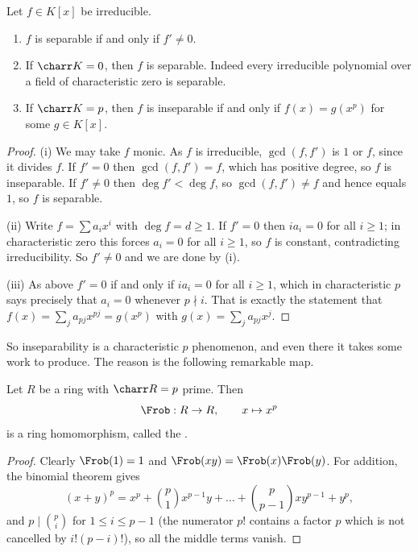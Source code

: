 \begin{proposition}\label{prop:sepcrit}
	Let $f \in K[x]$ be irreducible.
	\begin{enumerate}[label=(\roman*)]
		\item $f$ is separable if and only if $f' \neq 0$.
		\item If $\charr K = 0$, then $f$ is separable. Indeed every irreducible polynomial over a field of characteristic zero is separable.
		\item If $\charr K = p$, then $f$ is inseparable if and only if $f(x) = g(x^p)$ for some $g \in K[x]$.
	\end{enumerate}
\end{proposition}

\begin{proof}
	(i) We may take $f$ monic. As $f$ is irreducible, $\gcd(f,f')$ is $1$ or $f$, since it divides $f$. If $f' = 0$ then $\gcd(f,f') = f$, which has positive degree, so $f$ is inseparable. If $f' \neq 0$ then $\deg f' < \deg f$, so $\gcd(f,f') \neq f$ and hence equals $1$, so $f$ is separable.

	(ii) Write $f = \sum a_i x^i$ with $\deg f = d \geq 1$. If $f' = 0$ then $ia_i = 0$ for all $i \geq 1$; in characteristic zero this forces $a_i = 0$ for all $i \geq 1$, so $f$ is constant, contradicting irreducibility. So $f' \neq 0$ and we are done by (i).

	(iii) As above $f' = 0$ if and only if $ia_i = 0$ for all $i \geq 1$, which in characteristic $p$ says precisely that $a_i = 0$ whenever $p \nmid i$. That is exactly the statement that $f(x) = \sum_j a_{pj}x^{pj} = g(x^p)$ with $g(x) = \sum_j a_{pj}x^j$.
\end{proof}

So inseparability is a characteristic $p$ phenomenon, and even there it takes some work to produce. The reason is the following remarkable map.

\begin{proposition}[Frobenius]\label{prop:frob}
	Let $R$ be a ring with $\charr R = p$ prime. Then
	$$\Frob : R \to R, \qquad x \mapsto x^p$$
	is a ring homomorphism, called the .
\end{proposition}

\begin{proof}
	Clearly $\Frob(1) = 1$ and $\Frob(xy) = \Frob(x)\Frob(y)$. For addition, the binomial theorem gives
	$$(x+y)^p = x^p + \binom{p}{1}x^{p-1}y + \dots + \binom{p}{p-1}xy^{p-1} + y^p,$$
	and $p \mid \binom{p}{i}$ for $1 \leq i \leq p-1$ (the numerator $p!$ contains a factor $p$ which is not cancelled by $i!(p-i)!$), so all the middle terms vanish.
\end{proof}

